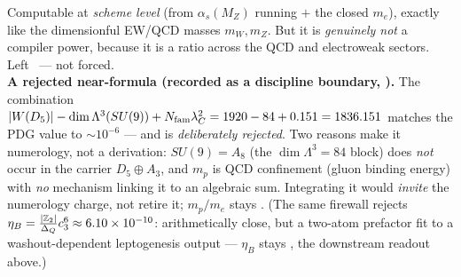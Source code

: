 \begin{keybox}
Computable at \emph{scheme level} (from $\alpha_s(M_Z)$ running $+$ the closed $m_e$), exactly like the
dimensionful EW/QCD masses $m_W,m_Z$. But it is \emph{genuinely not} a compiler power, because it is a
ratio across the QCD and electroweak sectors. Left \mO\ --- not forced.
\smallskip\\
\noindent\textbf{A rejected near-formula (recorded as a discipline boundary, ).}
The combination $|W(D_5)|-\dim\Lambda^3(SU(9))+N_{\mathrm{fam}}\lambda_C^2=1920-84+0.151=1836.151$ matches the PDG value to
$\sim10^{-6}$ --- and is \emph{deliberately rejected}. Two reasons make it numerology, not a derivation:
$SU(9)=A_8$ (the $\dim\Lambda^3=84$ block) does \emph{not} occur in the carrier $D_5\oplus A_3$, and $m_p$ is
QCD confinement (gluon binding energy) with \emph{no} mechanism linking it to an algebraic sum. Integrating it
would \emph{invite} the numerology charge, not retire it; $m_p/m_e$ stays \mO. (The same firewall rejects
$\eta_B=\tfrac{|\mathbb{Z}_2|}{\Delta_Q}c_3^6\approx6.10\times10^{-10}$: arithmetically close, but a two-atom
prefactor fit to a washout-dependent leptogenesis output --- $\eta_B$ stays \mC, the downstream readout above.)
\end{keybox}


